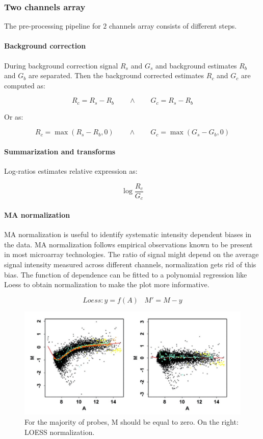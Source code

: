 		\subsubsection{Two channels array}
		The pre-processing pipeline for $2$ channels array consists of different steps.

			\paragraph{Background correction}
			During background correction signal $R_s$ and $G_s$ and background estimates $R_b$ and $G_b$ are separated.
			Then the background corrected estimates $R_c$ and $G_c$ are computed as:

			$$R_c = R_s-R_b\qquad\land\qquad G_c = R_s-R_b$$

			Or as:

			$$R_c = \max(R_s-R_b, 0)\qquad\land\qquad G_c = \max(G_s-G_b, 0)$$

			\paragraph{Summarization and transforms}
			Log-ratios estimates relative expression as:

			$$\log\frac{R_c}{G_c}$$

			\paragraph{MA normalization}
			MA normalization is useful to identify systematic intensity dependent biases in the data.
			MA normalization follows empirical observations known to be present in most microarray technologies.
			The ratio of signal might depend on the average signal intensity measured across different channels, normalization gets rid of this bias.
			The function of dependence can be fitted to a polynomial regression like Loess to obtain normalization to make the plot more informative.

			$$Loess: y = f (A) \,\,\,\,\, M' = M - y$$

			\begin{figure}
			\centering
			\includegraphics[scale=0.25]{MA}
			\caption{For the majority of probes, M should be equal to zero. On the right: LOESS normalization.}
			\end{figure}

